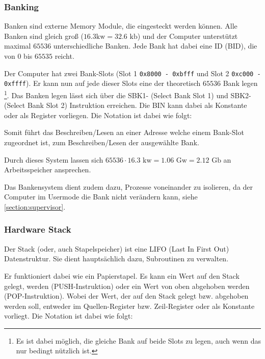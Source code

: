 \documentclass{scrartcl}
\begin{document}
\subsubsection{\label{section:banking}Banking}


Banken sind externe Memory Module, die eingesteckt werden können. Alle Banken sind gleich groß ($16.3\text{kw} = 32.6\text{ kb}$) und der Computer unterstützt maximal $65536$ unterschiedliche Banken. Jede Bank hat dabei eine ID (BID), die von $0$ bis $65535$ reicht.

Der Computer hat zwei Bank-Slots (Slot 1 \texttt{0x8000 - 0xbfff} und Slot 2 \texttt{0xc000 - 0xffff}). Er kann nun auf jede dieser Slots eine der theoretisch $65536$ Bank legen
\footnote{Es ist dabei möglich, die gleiche Bank auf beide Slots zu legen, auch wenn das nur bedingt nützlich ist.}. Das Banken legen lässt sich über die SBK1- (Select Bank Slot 1) und SBK2- (Select Bank Slot 2) Instruktion erreichen. Die BIN kann dabei als Konstante oder als Register vorliegen. Die Notation ist dabei wie folgt:


Somit führt das Beschreiben/Lesen an einer Adresse welche einem Bank-Slot zugeordnet ist, zum Beschreiben/Lesen der ausgewählte Bank.

Durch dieses System lassen sich $65536 \cdot 16.3\text{ kw} = 1.06\text{ Gw} = 2.12\text{ Gb}$ an Arbeitsspeicher ansprechen.

Das Bankensystem dient zudem dazu, Prozesse voneinander zu isolieren, da der Computer im Usermode  die Bank nicht verändern kann, siehe \autoref{section:supervisor}.

\subsubsection{\label{section:stack}Hardware Stack}

Der Stack (oder, auch Stapelspeicher) ist eine LIFO (Last In First Out) Datenstruktur. Sie dient hauptsächlich dazu, Subroutinen zu verwalten. 

Er funktioniert dabei wie ein Papierstapel. Es kann ein Wert auf den Stack gelegt, werden (PUSH-Instruktion) oder ein Wert von oben abgehoben werden (POP-Instruktion). Wobei der Wert, der auf den Stack gelegt bzw. abgehoben werden soll, entweder im Quellen-Register bzw. Zeil-Register oder als Konstante vorliegt. Die Notation ist dabei wie folgt:

\end{document}
